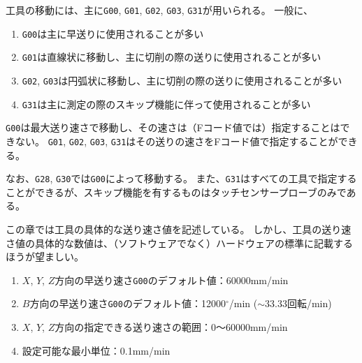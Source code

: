


工具の移動には、主に\verb|G00|, \verb|G01|, \verb|G02|, \verb|G03|, \verb|G31|が用いられる。
一般に、
\begin{enumerate}
\item \verb|G00|は主に早送りに使用されることが多い
\item \verb|G01|は直線状に移動し、主に切削の際の送りに使用されることが多い
\item \verb|G02|, \verb|G03|は円弧状に移動し、主に切削の際の送りに使用されることが多い
\item \verb|G31|は主に測定の際のスキップ機能に伴って使用されることが多い
\end{enumerate}
\verb|G00|は最大送り速さで移動し、その速さは（Fコード値では）指定することはできない。
\verb|G01|, \verb|G02|, \verb|G03|, \verb|G31|はその送りの速さをFコード値で指定することができる。

なお、\verb|G28|, \verb|G30|では\verb|G00|によって移動する。
また、\verb|G31|はすべての工具で指定することができるが、スキップ機能を有するものはタッチセンサープローブのみである。
\begin{hosoku}
この章では工具の具体的な送り速さ値を記述している。
しかし、工具の送り速さ値の具体的な数値は、（ソフトウェアでなく）ハードウェアの標準に記載するほうが望ましい。
\end{hosoku}



\begin{enumerate}
\item $X$, $Y$, $Z$方向の早送り速さ\verb|G00|のデフォルト値：60000mm/min
\item $B$方向の早送り速さ\verb|G00|のデフォルト値：12000$^\circ$/min ($\sim 33.33$回転/min)
\item $X$, $Y$, $Z$方向の指定できる送り速さの範囲：0～60000mm/min
\item 設定可能な最小単位：0.1mm/min
\end{enumerate}



